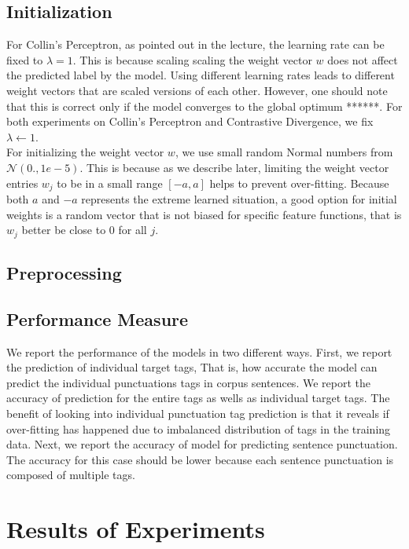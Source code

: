\documentclass[twoside,12pt]{article}
\begin{document}
\subsection{Initialization}
For Collin's Perceptron, as pointed out in the lecture, the learning rate can be fixed to $\lambda=1$. This is because scaling scaling the weight vector $w$ does not affect the predicted label by the model. Using different learning rates leads to different weight vectors that are scaled versions of each other. However, one should note that this is correct only if the model converges to the global optimum ******. For both experiments on Collin's Perceptron and Contrastive Divergence, we fix $\lambda \leftarrow 1$. \\
For initializing the weight vector $w$, we use small random Normal numbers from $\mathcal N(0.,1e-5)$. This is because as we describe later, limiting the weight vector entries $w_j$ to be in a small range $[-a,a]$ helps to prevent over-fitting. Because both $a$ and $-a$ represents the extreme learned situation, a good option for initial weights is a random vector that is not biased for specific feature functions, that is $w_j$ better be close to 0 for all $j$.\\
\subsection{Preprocessing}
\subsection{Performance Measure}
We report the performance of the models in two different ways. First, we report the prediction of individual target tags, That is, how accurate the model can predict the individual punctuations tags in corpus sentences. We report the accuracy of prediction for the entire tags as wells as individual target tags. The benefit of looking into individual punctuation tag prediction is that it reveals if over-fitting has happened due to imbalanced distribution of tags in the training data. Next, we report the accuracy of model for predicting sentence punctuation. The accuracy for this case should be lower because each sentence punctuation is composed of multiple tags. 
\section{Results of Experiments}
\end{document}
